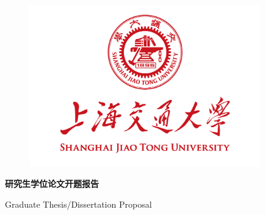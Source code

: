 \documentclass[a4paper,zihao=-4,AutoFakeBold]{ctexart}
\begin{document}
\pagestyle{empty}

\begin{figure}[h]
    \centering
    \includegraphics[width=10cm]{figures/sjtu-logo.png}
\end{figure}

\begin{center}
    \bfseries\songti
    \vspace{-0.5cm}
     研究生学位论文开题报告\par\vspace{18.8pt}
     Graduate Thesis/Dissertation Proposal
    \vspace{0.5cm}
\end{center}
\end{document}
